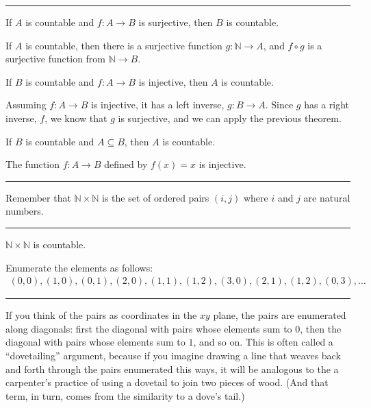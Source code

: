 \documentclass[letterpaper,10pt,english]{sphinxmanual}
\begin{document}
\bigskip\hrule\bigskip


\sphinxAtStartPar
{} If \(A\) is countable and \(f : A \to B\) is surjective, then \(B\) is countable.

\sphinxAtStartPar
{} If \(A\) is countable, then there is a surjective function \(g : \mathbb{N} \to A\), and \(f \circ g\) is a surjective function from \(\mathbb{N} \to B\).

\sphinxAtStartPar
{} If \(B\) is countable and \(f : A \to B\) is injective, then \(A\) is countable.

\sphinxAtStartPar
{} Assuming \(f : A \to B\) is injective, it has a left inverse, \(g : B \to A\). Since \(g\) has a right inverse, \(f\), we know that \(g\) is surjective, and we can apply the previous theorem.

\sphinxAtStartPar
{} If \(B\) is countable and \(A \subseteq B\), then \(A\) is countable.

\sphinxAtStartPar
{} The function \(f : A \to B\) defined by \(f(x) = x\) is injective.


\bigskip\hrule\bigskip


\sphinxAtStartPar
Remember that \(\mathbb{N} \times \mathbb{N}\) is the set of ordered pairs \((i, j)\) where \(i\) and \(j\) are natural numbers.


\bigskip\hrule\bigskip


\sphinxAtStartPar
{} \(\mathbb{N} \times \mathbb{N}\) is countable.

\sphinxAtStartPar
{} Enumerate the elements as follows:
\begin{equation*}
\begin{split}(0, 0), (1, 0), (0, 1), (2, 0), (1, 1), (1, 2), (3, 0), (2, 1), (1, 2), (0, 3), \ldots\end{split}
\end{equation*}

\bigskip\hrule\bigskip


\sphinxAtStartPar
If you think of the pairs as coordinates in the \(x\)\sphinxhyphen{}\(y\) plane, the pairs are enumerated along diagonals: first the diagonal with pairs whose elements sum to \(0\), then the diagonal with pairs whose elements sum to \(1\), and so on. This is often called a “dovetailing” argument, because if you imagine drawing a line that weaves back and forth through the pairs enumerated this ways, it will be analogous to the a carpenter’s practice of using a dovetail to join two pieces of wood. (And that term, in turn, comes from the similarity to a dove’s tail.)
\end{document}
